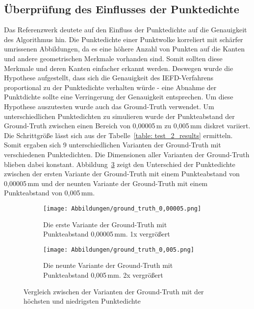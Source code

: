\subsection{Überprüfung des Einflusses der Punktedichte} \label{test_2}
Das Referenzwerk \autocite{ni_edge_2016} deutete auf den Einfluss der Punktedichte auf die Genauigkeit des Algorithmus hin. Die Punktedichte einer Punktwolke korreliert mit schärfer umrissenen Abbildungen, da es eine höhere Anzahl von Punkten auf die Kanten und andere geometrischen Merkmale vorhanden sind. Somit sollten diese Merkmale und deren Kanten einfacher erkannt werden. Deswegen wurde die Hypothese aufgestellt, dass sich die Genauigkeit des IEFD-Verfahrens proportional zu der Punktedichte verhalten würde - eine Abnahme der Punktdichte sollte eine Verringerung der Genauigkeit entsprechen. Um diese Hypothese auszutesten wurde auch das Ground-Truth verwendet. Um unterschiedlichen Punktedichten zu simulieren wurde der Punkteabstand der Ground-Truth zwischen einen Bereich von 0,00005\,\si{\m} zu 0,005\,\si{\m}m diskret variiert. Die Schrittgröße lässt sich aus der Tabelle~\ref{table: test_2_results} ermitteln. Somit ergaben sich 9 unterschiedlichen Varianten der Ground-Truth mit verschiedenen Punktedichten. Die Dimensionen aller Varianten der Ground-Truth blieben dabei konstant. Abbildung~\ref{fig: testdata_pointdensity_comparision} zeigt den Unterschied der Punktedichte zwischen der ersten Variante der Ground-Truth mit einem Punkteabstand von 0,00005\,\si{\m}m und der neunten Variante der Ground-Truth mit einem Punkteabstand von 0,005\,\si{\m}m.

\begin{figure}[h]
	\centering
	\begin{subfigure}{0.49\textwidth}
		\texttt{[image: Abbildungen/ground\_truth\_0,00005.png]}
		\centering
		\caption[Ground-Truth mit Punkteabstand von 0,00005\,\si{\m}]{Die erste Variante der Ground-Truth mit Punkteabstand 0,00005\,\si{\m}m. 1x vergrößert}
		\label{fig: testdata_0,00005m}
	\end{subfigure}
	\hfill
	\begin{subfigure}{0.49\textwidth}
		\texttt{[image: Abbildungen/ground\_truth\_0,005.png]}
		\centering
		\caption[Ground-Truth mit Punkteabstand von 0,005\,\si{\m}m]{Die neunte Variante der Ground-Truth mit Punkteabstand 0,005\,\si{\m}m. 2x vergrößert}
		\label{fig: testdata_0,005m}
	\end{subfigure}
	\caption[Unterschiedliche Punktedichten der Ground-Truth Datei]{Vergleich zwischen der Varianten der Ground-Truth mit der höchsten und niedrigsten Punktedichte}
	\label{fig: testdata_pointdensity_comparision}
\end{figure}

